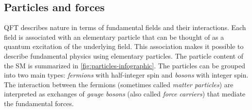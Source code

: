 \subsection{Particles and forces}
\label{subsec:particle-content}
QFT describes nature in terms of fundamental fields and their interactions. Each field is associated with an elementary particle that can be thought of as a quantum excitation of the underlying field.
This association makes it possible to describe fundamental physics using elementary particles.
The particle content of the SM is summarized in \cref{fig:particles-infographic}.
The particles can be grouped into two main types:
\emph{fermions} with half-integer spin and \emph{bosons} with integer spin. The interaction between the fermions (sometimes called \emph{matter particles}) are interpreted as exchanges of \emph{gauge bosons} (also called \emph{force carriers}) that mediate the fundamental forces.

